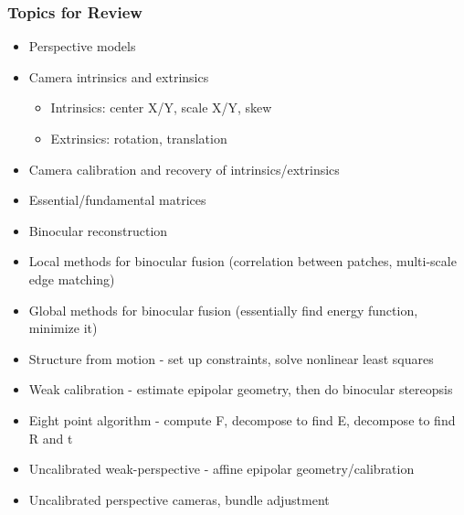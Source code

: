 \subsubsection*{Topics for Review}
\begin{itemize}
\item Perspective models
\item Camera intrinsics and extrinsics
  \begin{itemize}
    \item Intrinsics: center X/Y, scale X/Y, skew
    \item Extrinsics: rotation, translation
  \end{itemize}
\item Camera calibration and recovery of intrinsics/extrinsics
\item Essential/fundamental matrices
\item Binocular reconstruction
\item Local methods for binocular fusion (correlation between patches, multi-scale edge matching)
\item Global methods for binocular fusion (essentially find energy function, minimize it)
\item Structure from motion - set up constraints, solve nonlinear least squares
\item Weak calibration - estimate epipolar geometry, then do binocular stereopsis
\item Eight point algorithm - compute F, decompose to find E, decompose to find R and t
\item Uncalibrated weak-perspective - affine epipolar geometry/calibration
\item Uncalibrated perspective cameras, bundle adjustment
\end{itemize}

